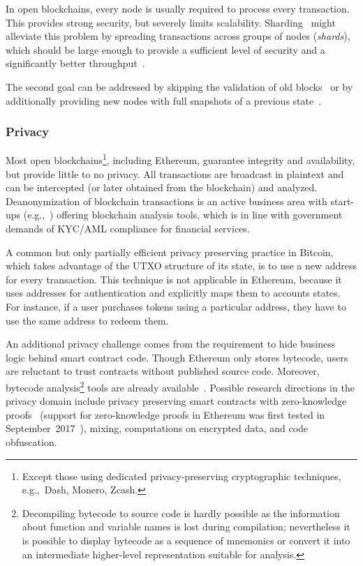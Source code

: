 In open blockchains, every node is usually required to process every transaction.
This provides strong security, but severely limits scalability.
Sharding~\cite{Gencer2016, Luu2016a} might alleviate this problem by spreading transactions across groups of nodes (\textit{shards}), which should be large enough to provide a sufficient level of security and a significantly better throughput~\cite{ShardingFAQ}.

The second goal can be addressed by skipping the validation of old blocks~\cite{Junge17} or by additionally providing new nodes with full snapshots of a previous state~\cite{ParityWarpSync}.


\subsubsection{Privacy}
Most open blockchains\footnote{Except those using dedicated privacy-preserving cryptographic techniques, e.g.,~Dash, Monero, Zcash.}, including Ethereum, guarantee integrity and availability, but provide little to no privacy.
All transactions are broadcast in plaintext and can be intercepted (or later obtained from the blockchain) and analyzed.
Deanonymization of blockchain transactions is an active business area with start-ups (e.g.,~\cite{Chainalysis}) offering blockchain analysis tools, which is in line with government demands of KYC/AML compliance for financial services.

A common but only partially efficient privacy preserving practice in Bitcoin, which takes advantage of the UTXO structure of its state, is to use a new address for every transaction.
This technique is not applicable in Ethereum, because it uses addresses for authentication and explicitly maps them to accounts states.
For instance, if a user purchases tokens using a particular address, they have to use the same address to redeem them.

An additional privacy challenge comes from the requirement to hide business logic behind smart contract code.
Though Ethereum only stores bytecode, users are reluctant to trust contracts without published source code.
Moreover, bytecode analysis\footnote{Decompiling bytecode to source code is hardly possible as the information about function and variable names is lost during compilation; nevertheless it is possible to display bytecode as a sequence of mnemonics or convert it into an intermediate higher-level representation suitable for analysis.} tools are already available~\cite{Norvill2017, Suiche2017}.
Possible research directions in the privacy domain include privacy preserving smart contracts with zero-knowledge proofs~\cite{Kosba2016} (support for zero-knowledge proofs in Ethereum was first tested in September~2017~\cite{OLeary2017}), mixing, computations on encrypted data, and code obfuscation.

